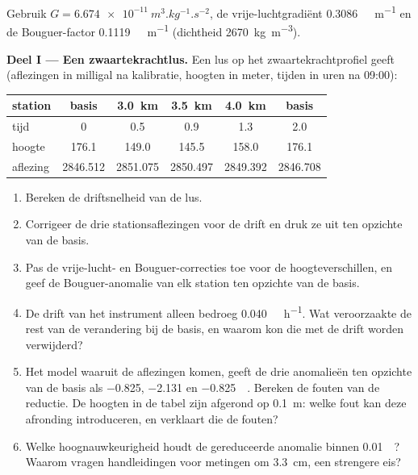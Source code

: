 \begin{problem}
\label{pb:b3:field-lab-methods-3:1}
Gebruik $G = \qty{6.674e-11}{m^3.kg^{-1}.s^{-2}}$, de vrije-luchtgradiënt
\qty{0.3086}{\milli\gal.m^{-1}} en de Bouguer-factor
\qty{0.1119}{\milli\gal.m^{-1}} (dichtheid \qty{2670}{kg.m^{-3}}).

\medskip\noindent\textbf{Deel I --- Een zwaartekrachtlus.} Een lus op het
zwaartekrachtprofiel geeft (aflezingen in milligal na kalibratie, hoogten
in meter, tijden in uren na 09:00):
\begin{center}
\small
\begin{tabular}{lccccc}
\hline
station & basis & \qty{3.0}{km} & \qty{3.5}{km} & \qty{4.0}{km} & basis \\
\hline
tijd & 0 & 0.5 & 0.9 & 1.3 & 2.0 \\
hoogte & 176.1 & 149.0 & 145.5 & 158.0 & 176.1 \\
aflezing & 2846.512 & 2851.075 & 2850.497 & 2849.392 & 2846.708 \\
\hline
\end{tabular}
\end{center}
\begin{enumerate}
\item Bereken de driftsnelheid van de lus.
\item Corrigeer de drie stationsaflezingen voor de drift en druk ze
  uit ten opzichte van de basis.
\item Pas de vrije-lucht- en Bouguer-correcties toe voor de
  hoogteverschillen, en geef de Bouguer-anomalie van elk station ten opzichte van
  de basis.
\item De drift van het instrument alleen bedroeg \qty{0.040}{\milli\gal.h^{-1}}. Wat veroorzaakte
  de rest van de verandering bij de basis, en waarom kon die met de
  drift worden verwijderd?
\item Het model waaruit de aflezingen komen, geeft de drie anomalieën
  ten opzichte van de basis als \num{-0.825}, \num{-2.131} en
  \qty{-0.825}{\milli\gal}. Bereken de fouten van de reductie. De
  hoogten in de tabel zijn afgerond op \qty{0.1}{m}: welke fout kan deze
  afronding introduceren, en verklaart die de fouten?
\item Welke hoognauwkeurigheid houdt de gereduceerde anomalie binnen
  \qty{0.01}{\milli\gal}? Waarom vragen handleidingen voor metingen om
  \qty{3.3}{cm}, een strengere eis?
\end{enumerate}


\end{problem}
